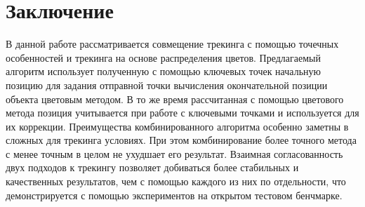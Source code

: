 \section{Заключение}

В данной работе рассматривается совмещение трекинга с помощью точечных
особенностей и трекинга на основе распределения цветов.
Предлагаемый алгоритм использует полученную с помощью ключевых точек начальную
позицию для задания отправной точки вычисления окончательной позиции объекта
цветовым методом.
В то же время рассчитанная с помощью цветового метода позиция учитывается при
работе с ключевыми точками и используется для их коррекции.
Преимущества комбинированного алгоритма особенно заметны в сложных для трекинга
условиях.
При этом комбинирование более точного метода с менее точным в целом не ухудшает
его результат.
Взаимная согласованность двух подходов к трекингу позволяет добиваться более
стабильных и качественных результатов, чем с помощью каждого из них по
отдельности, что демонстрируется с помощью экспериментов на открытом тестовом
бенчмарке.
